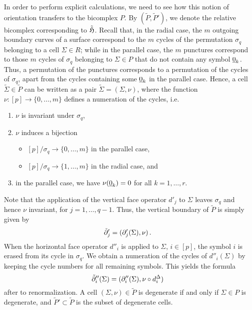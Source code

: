 In order to perform explicit calculations, we need to see how this notion of orientation transfers to the bicomplex $P$.
By $(\tilde P, \tilde P')$, we denote the relative bicomplex corresponding to $\tilde {\mathfrak H}$.
Recall that, in the radial case, the $m$ outgoing boundary curves of a surface 
correspond to the $m$ cycles of the permutation $\sigma_q$ belonging to a cell $\Sigma \in R$;
while in the parallel case, the $m$ punctures correspond to those $m$ cycles of $\sigma_q$ belonging to $\Sigma \in P$
that do not contain any symbol $\underline{\smash{0}}_k$. 
Thus, a permutation of the punctures corresponds to a permutation of the cycles of $\sigma_q$,
apart from the cycles containing some $\underline{\smash{0}}_k$ in the parallel case.
Hence, a cell $\tilde \Sigma \in \tilde P$ can be written as a pair $\tilde \Sigma = (\Sigma, \nu)$, 
where the function $\nu \colon [p] \to \{0, \dotsc, m\}$ defines a numeration of the cycles, i.e.
\begin{enumerate}
   \item $\nu$ is invariant under $\sigma_q$,
   \item $\nu$ induces a bijection
   \begin{itemize}
      \item $[p]/ \sigma_q \to \{0, \dotsc, m\}$ in the parallel case,
      \item $[p]/ \sigma_q \to \{1, \dotsc, m\}$ in the radial case, and
   \end{itemize}
   \item in the parallel case, we have $\nu(\underline{\smash{0}}_k) = 0$ for all $k = 1, \dotsc, r$.
\end{enumerate}
Note that the application of the vertical face operator $d'_j$ to $\Sigma$ leaves $\sigma_q$ and hence $\nu$ invariant, for $j = 1, \dotsc, q-1$.
Thus, the vertical boundary of $\tilde P$ is simply given by 
\[
   \tilde {\partial}_j' = (\partial_j'(\Sigma), \nu)\,.
\]
When the horizontal face operator $d''_i$ is applied to $\Sigma$, $i \in [p]$, the symbol $i$ is erased from its cycle in $\sigma_q$.
We obtain a numeration of the cycles of $d''_i(\Sigma)$ by keeping the cycle numbers for all remaining symbols.
This yields the formula 
\[
   \tilde {\partial}_i''(\Sigma) = (\partial_i''(\Sigma), \nu \circ d_i^\Delta) 
\]
after to renormalization.
A cell $(\Sigma, \nu) \in \tilde P$ is degenerate if and only if $\Sigma \in P$ is degenerate, 
and $\tilde P' \subset \tilde P$ is the subset of degenerate cells.

